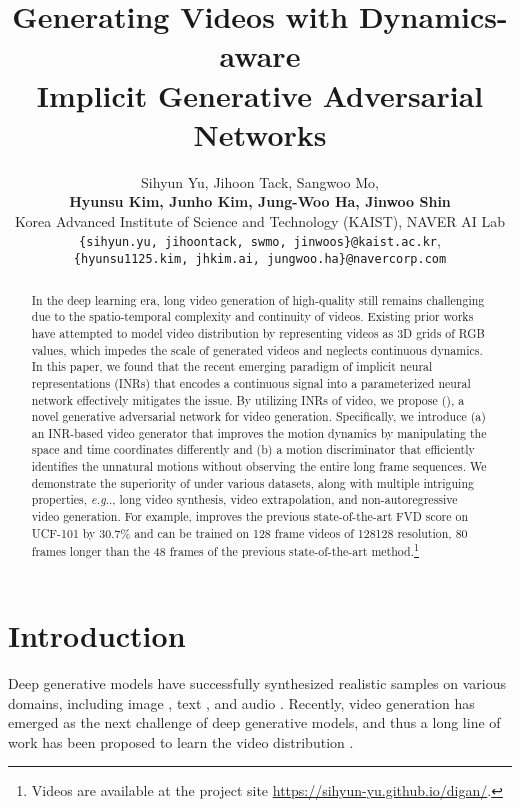 \documentclass{article} \usepackage{iclr2022_conference,times}
\title{Generating Videos with Dynamics-aware\\Implicit Generative Adversarial Networks}
\author{Sihyun Yu, Jihoon Tack, Sangwoo Mo, \\
{\textbf{Hyunsu Kim, Junho Kim, Jung-Woo Ha, Jinwoo Shin}}  \\
Korea Advanced Institute of Science and Technology (KAIST), NAVER AI Lab\\
\texttt{\{sihyun.yu, jihoontack, swmo, jinwoos\}@kaist.ac.kr}, \\\texttt{\{hyunsu1125.kim, jhkim.ai, jungwoo.ha\}@navercorp.com}}
\makeatletter
\DeclareRobustCommand\onedot{\futurelet\@let@token\@onedot}
\def\@onedot{\ifx\@let@token.\else.\null\fi\xspace}
\def\eg{\emph{e.g}\onedot} \def\Eg{\emph{E.g}\onedot}
\makeatother
\begin{document}
\maketitle

\vspace{-0.1in}
\begin{abstract}
In the deep learning era, long video generation of high-quality still remains challenging due to the spatio-temporal complexity and continuity of videos. Existing prior works have attempted to model video distribution by representing videos as 3D grids of RGB values, which impedes the scale of generated videos and neglects continuous dynamics. In this paper, we found that the recent emerging paradigm of implicit neural representations (INRs) that encodes a continuous signal into a parameterized neural network effectively mitigates the issue. By utilizing INRs of video, we propose \emph{\lname} (\sname), a novel generative adversarial network for video generation. Specifically, we introduce (a) an INR-based video generator that improves the motion dynamics by manipulating the space and time coordinates differently and (b) a motion discriminator that efficiently identifies the unnatural motions without observing the entire long frame sequences. We demonstrate the superiority of \sname under various datasets, along with multiple intriguing properties, \eg, long video synthesis, video extrapolation, and non-autoregressive video generation. For example, \sname improves the previous state-of-the-art FVD score on UCF-101 by 30.7\% and can be trained on 128 frame videos of 128128 resolution, 80 frames longer than the 48 frames of the previous state-of-the-art method.\footnote{Videos are available at the project site \url{https://sihyun-yu.github.io/digan/}.}
\end{abstract}

\section{Introduction}
\label{sec:intro}

Deep generative models have successfully synthesized realistic samples on various domains, including image \citep{brock2018large,karras2020analyzing,karras2021alias,dhariwal2021diffusion}, text \citep{adiwardana2020towards,brown2020language}, and audio \citep{dhariwal2020jukebox, lakhotia2021generative}. Recently, video generation has emerged as the next challenge of deep generative models, and thus a long line of work has been proposed to learn the video distribution \citep{vondrick2016generating,kalchbrenner2017video,saito2017temporal,saito2020train,tulyakov2018mocogan,acharya2018towards,clark2019adversarial,weissenborn2020scaling,rakhimov2020latent,tian2021good,yan2021videogpt}. 
\end{document}
